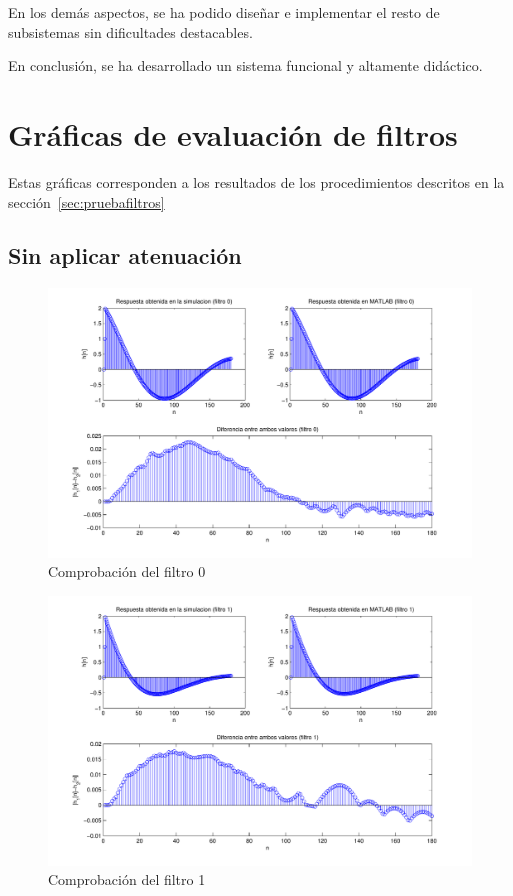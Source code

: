 \documentclass[a4paper,12pt]{article}
\begin{document}
En los demás aspectos, se ha podido diseñar e implementar el resto de subsistemas sin dificultades destacables.

En conclusión, se ha desarrollado un sistema funcional y altamente didáctico.

\appendix
\clearpage
\addappheadtotoc
\appendixpage
\section{Gráficas de evaluación de filtros}\label{sec:resultadosfiltros}
Estas gráficas corresponden a los resultados de los procedimientos descritos en la sección~\ref{sec:pruebafiltros}
\subsection{Sin aplicar atenuación}
\begin{figure}[hbt]
\includegraphics[width=\textwidth]{img/respfiltro0.pdf} 
\caption{Comprobación del filtro 0} \label{fig:filter0}
\end{figure}

\begin{figure}[hbt]
\includegraphics[width=\textwidth]{img/respfiltro1.pdf} 
\caption{Comprobación del filtro 1} \label{fig:filter1}
\end{figure}
\end{document}
